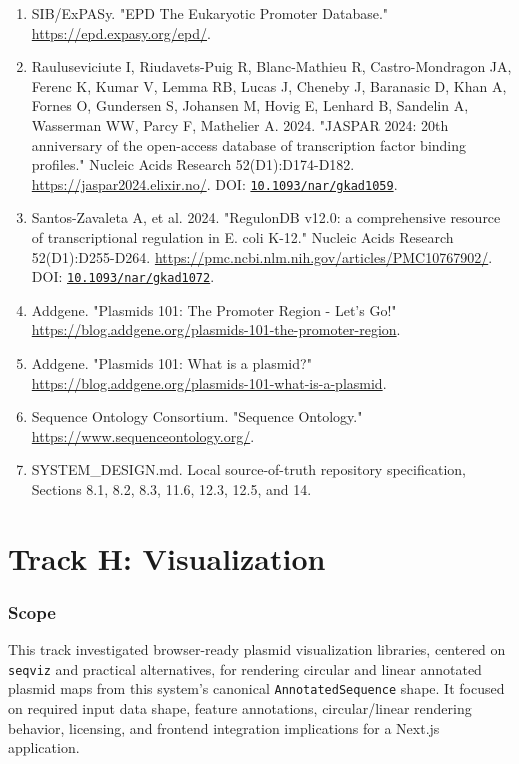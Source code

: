 \documentclass[11pt]{report}
\begin{document}
\begin{enumerate}
\item SIB/ExPASy. "EPD The Eukaryotic Promoter Database." \url{https://epd.expasy.org/epd/}.
\item Rauluseviciute I, Riudavets-Puig R, Blanc-Mathieu R, Castro-Mondragon JA, Ferenc K, Kumar V, Lemma RB, Lucas J, Cheneby J, Baranasic D, Khan A, Fornes O, Gundersen S, Johansen M, Hovig E, Lenhard B, Sandelin A, Wasserman WW, Parcy F, Mathelier A. 2024. "JASPAR 2024: 20th anniversary of the open-access database of transcription factor binding profiles." Nucleic Acids Research 52(D1):D174-D182. \url{https://jaspar2024.elixir.no/}. DOI: \href{https://doi.org/10.1093/nar/gkad1059}{\nolinkurl{10.1093/nar/gkad1059}}.
\item Santos-Zavaleta A, et al. 2024. "RegulonDB v12.0: a comprehensive resource of transcriptional regulation in E. coli K-12." Nucleic Acids Research 52(D1):D255-D264. \url{https://pmc.ncbi.nlm.nih.gov/articles/PMC10767902/}. DOI: \href{https://doi.org/10.1093/nar/gkad1072}{\nolinkurl{10.1093/nar/gkad1072}}.
\item Addgene. "Plasmids 101: The Promoter Region - Let's Go!" \url{https://blog.addgene.org/plasmids-101-the-promoter-region}.
\item Addgene. "Plasmids 101: What is a plasmid?" \url{https://blog.addgene.org/plasmids-101-what-is-a-plasmid}.
\item Sequence Ontology Consortium. "Sequence Ontology." \url{https://www.sequenceontology.org/}.
\item SYSTEM\_DESIGN.md. Local source-of-truth repository specification, Sections 8.1, 8.2, 8.3, 11.6, 12.3, 12.5, and 14.
\end{enumerate}

\chapter{Track H: Visualization}

\subsection{Scope}
This track investigated browser-ready plasmid visualization libraries, centered on \texttt{seqviz} and practical alternatives, for rendering circular and linear annotated plasmid maps from this system's canonical \texttt{AnnotatedSequence} shape. It focused on required input data shape, feature annotations, circular/linear rendering behavior, licensing, and frontend integration implications for a Next.js application.\par
\end{document}
